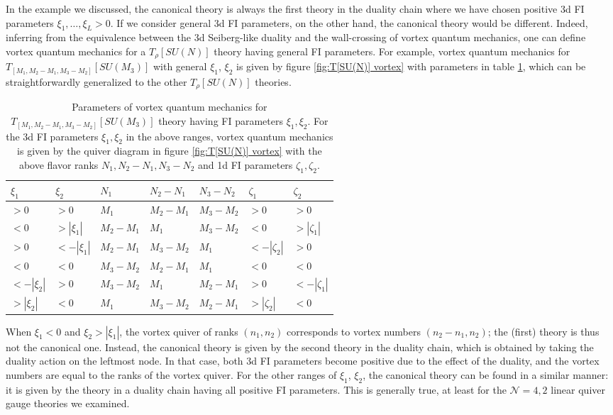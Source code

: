 \documentclass[a4paper,11pt]{article}
\begin{document}
In the example we discussed, the canonical theory is always the first theory in the duality chain where we have chosen positive 3d
FI parameters $\xi_1,\ldots,\xi_L > 0$. If we consider general 3d FI parameters, on the other hand, the canonical theory would be different. Indeed, inferring from the equivalence between the 3d Seiberg-like duality and the wall-crossing of vortex quantum mechanics, one can define vortex quantum mechanics for a $T_\rho [SU(N)]$ theory having general FI parameters. For example, vortex quantum mechanics for $T_{[M_1,M_2-M_1,M_3-M_2]} [SU(M_3)]$ with general $\xi_1$, $\xi_2$ is given by figure \ref{fig:T[SU(N)] vortex} with parameters in table \ref{tab:general FI}, which can be straightforwardly generalized to the other $T_\rho [SU(N)]$ theories.
%
\begin{table}[tbp]
\centering
\begin{tabular}{|l|l||l|l|l|l|l|}
\hline
$\xi_1$ & $\xi_2$ & $N_1$ & $N_2-N_1$ & $N_3-N_2$ & $\zeta_1$ & $\zeta_2$ \\
\hline
$> 0$ & $> 0$ & $M_1$ & $M_2-M_1$ & $M_3-M_2$ & $> 0$ & $> 0$ \\
$< 0$ & $> |\xi_1|$ & $M_2-M_1$ & $M_1$ & $M_3-M_2$ & $< 0$ & $> |\zeta_1|$ \\
$> 0$ & $< -|\xi_1|$ & $M_2-M_1$ & $M_3-M_2$ & $M_1$ & $< -|\zeta_2|$ & $> 0$ \\
$< 0$ & $< 0$ & $M_3-M_2$ & $M_2-M_1$ & $M_1$ & $< 0$ & $< 0$ \\
$< -|\xi_2|$ & $> 0$ & $M_3-M_2$ & $M_1$ & $M_2-M_1$ & $> 0$ & $< -|\zeta_1|$ \\
$> |\xi_2|$ & $< 0$ & $M_1$ & $M_3-M_2$ & $M_2-M_1$ & $> |\zeta_2|$ & $< 0$ \\
\hline
\end{tabular}
\caption{\label{tab:general FI} Parameters of vortex quantum mechanics for $T_{[M_1,M_2-M_1,M_3-M_2]} [SU(M_3)]$ theory having FI parameters $\xi_1,\xi_2$. For the 3d FI parameters $\xi_1,\xi_2$ in the above ranges, vortex quantum mechanics is given by the quiver diagram in figure \ref{fig:T[SU(N)] vortex} with the above flavor ranks $N_1,N_2-N_1,N_3-N_2$ and 1d FI parameters $\zeta_1,\zeta_2$.}
\end{table}
%
When $\xi_1 < 0$ and $\xi_2 > |\xi_1|$, the vortex quiver of ranks $(n_1,n_2)$ corresponds to vortex numbers $(n_2-n_1,n_2)$; the (first) theory is thus not the canonical one. Instead, the canonical theory is given by the second theory in the duality chain, which is obtained by taking the duality action on the leftmost node. In that case, both 3d FI parameters become positive due to the effect of the duality, and the vortex numbers are equal to the ranks of the vortex quiver. For the other ranges of $\xi_1$, $\xi_2$, the canonical theory can be found in a similar manner: it is given by the theory in a duality chain having all positive FI parameters. This is generally true, at least for the $\mathcal N = 4, 2$ linear quiver gauge theories we examined.
\\
\end{document}
